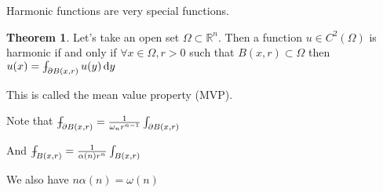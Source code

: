 \documentclass{article}
\theoremstyle{definition}
\newtheorem{theorem}{Theorem}
\def\Xint#1{\mathchoice
{\XXint\displaystyle\textstyle{#1}}%
{\XXint\textstyle\scriptstyle{#1}}%
{\XXint\scriptstyle\scriptscriptstyle{#1}}%
{\XXint\scriptscriptstyle\scriptscriptstyle{#1}}%
\!\int}
\def\XXint#1#2#3{{\setbox0=\hbox{$#1{#2#3}{\int}$ }
\vcenter{\hbox{$#2#3$ }}\kern-.6\wd0}}
\def\dashint{\Xint-}
\begin{document}
Harmonic functions are very special functions.

\begin{theorem}
    Let's take an open set \(\Omega \subset \mathbb{R} ^n\). Then a function \(u\in C^2(\Omega )\) is harmonic if and only if \(\forall x\in \Omega ,r>0\) such that \(B(x,r) \subset \Omega\) then \(u(x)=\dashint_{\partial B(x,r)} u(y)\,\mathrm{d} y\) 
\end{theorem}

This is called the mean value property (MVP).

Note that \(\dashint_{\partial B(x,r)}=\frac{1}{\omega _n r^{n-1}}\int_{\partial B(x,r)}\) 

And \(\dashint_{B(x,r)}=\frac{1}{\alpha (n) r^n}\int_{B(x,r)}\) 

We also have \(n \alpha (n)=\omega (n)\) 
\end{document}
